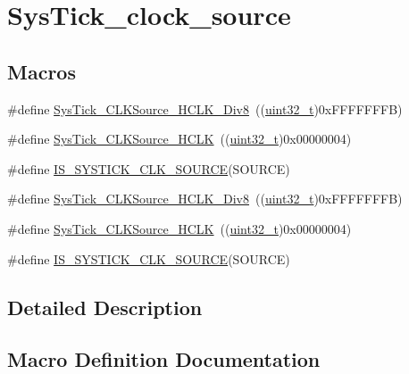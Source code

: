 \hypertarget{group___sys_tick__clock__source}{}\section{Sys\+Tick\+\_\+clock\+\_\+source}
\label{group___sys_tick__clock__source}
\subsection*{Macros}
\begin{DoxyCompactItemize}
\item 
\#define \hyperlink{group___sys_tick__clock__source_ga545c387ce43db90f15faad5f354f890d}{Sys\+Tick\+\_\+\+C\+L\+K\+Source\+\_\+\+H\+C\+L\+K\+\_\+\+Div8}~((\hyperlink{_p_e___types_8h_a33594304e786b158f3fb30289278f5af}{uint32\+\_\+t})0x\+F\+F\+F\+F\+F\+F\+F\+B)
\item 
\#define \hyperlink{group___sys_tick__clock__source_ga8a885ce2632ad4c35e229bb7c6e60191}{Sys\+Tick\+\_\+\+C\+L\+K\+Source\+\_\+\+H\+C\+LK}~((\hyperlink{_p_e___types_8h_a33594304e786b158f3fb30289278f5af}{uint32\+\_\+t})0x00000004)
\item 
\#define \hyperlink{group___sys_tick__clock__source_ga22d6291f6aed29442cf4cd9098fa0784}{I\+S\+\_\+\+S\+Y\+S\+T\+I\+C\+K\+\_\+\+C\+L\+K\+\_\+\+S\+O\+U\+R\+CE}(S\+O\+U\+R\+CE)
\item 
\#define \hyperlink{group___sys_tick__clock__source_ga545c387ce43db90f15faad5f354f890d}{Sys\+Tick\+\_\+\+C\+L\+K\+Source\+\_\+\+H\+C\+L\+K\+\_\+\+Div8}~((\hyperlink{_p_e___types_8h_a33594304e786b158f3fb30289278f5af}{uint32\+\_\+t})0x\+F\+F\+F\+F\+F\+F\+F\+B)
\item 
\#define \hyperlink{group___sys_tick__clock__source_ga8a885ce2632ad4c35e229bb7c6e60191}{Sys\+Tick\+\_\+\+C\+L\+K\+Source\+\_\+\+H\+C\+LK}~((\hyperlink{_p_e___types_8h_a33594304e786b158f3fb30289278f5af}{uint32\+\_\+t})0x00000004)
\item 
\#define \hyperlink{group___sys_tick__clock__source_ga22d6291f6aed29442cf4cd9098fa0784}{I\+S\+\_\+\+S\+Y\+S\+T\+I\+C\+K\+\_\+\+C\+L\+K\+\_\+\+S\+O\+U\+R\+CE}(S\+O\+U\+R\+CE)
\end{DoxyCompactItemize}


\subsection{Detailed Description}


\subsection{Macro Definition Documentation}
